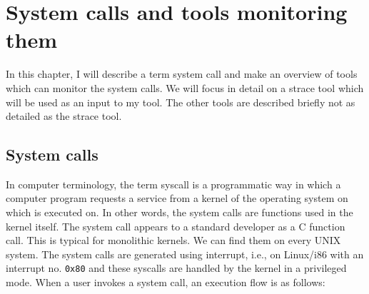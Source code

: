\chapter{System calls and tools monitoring them}
\label{chap:syscalls}
In this chapter, I will describe a term system call and make an overview of tools which can monitor the system calls.
We will focus in detail on a strace tool which will be used as an input to my tool.
The other tools are described briefly not as detailed as the strace tool.

\section{System calls}

In computer terminology, the term syscall is a programmatic way in which a computer program requests a service from a kernel of the operating system on which is executed on.
In other words, the system calls are functions used in the kernel itself.
The system call appears to a standard developer as a C function call.
This is typical for monolithic kernels.
We can find them on every UNIX system.
The system calls are generated using interrupt, i.e., on Linux/i86 with an interrupt no. \texttt{0x80} and these syscalls are handled by the kernel in a privileged mode.
When a user invokes a system call, an execution flow is as follows:

